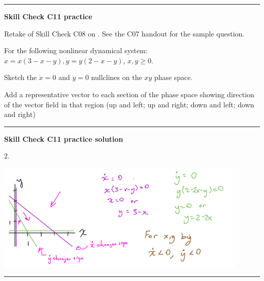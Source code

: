 \documentclass[12pt,letterpaper,noanswers]{exam}
\begin{document}
\vspace{0.2cm}
\hrule
\vspace{0.2cm}

\noindent\textbf{Skill Check C11 practice}
\begin{questions}

\item Retake of Skill Check C08 on .  See the C07 handout for the sample question.

\item For the following nonlinear dynamical system: $\dot x = x(3-x-y), \dot y = y(2-x-y)$, $x,y\geq 0$.
\begin{parts}
\item Sketch the $\dot x = 0$ and $\dot y = 0$ nullclines on the $xy$ phase space.
\item Add a representative vector to each section of the phase space showing direction of the vector field in that region (up and left; up and right; down and left; down and right)
\end{parts} 

\end{questions}

\vspace{0.2cm}

\hrule
\vspace{0.2cm}

\noindent\textbf{Skill Check C11 practice solution}

2. 

\includegraphics[width=0.9\textwidth]{img/C10-11nullclines-p1.png}


\vspace{0.2cm}

\hrule
\vspace{0.2cm}
\end{document}
